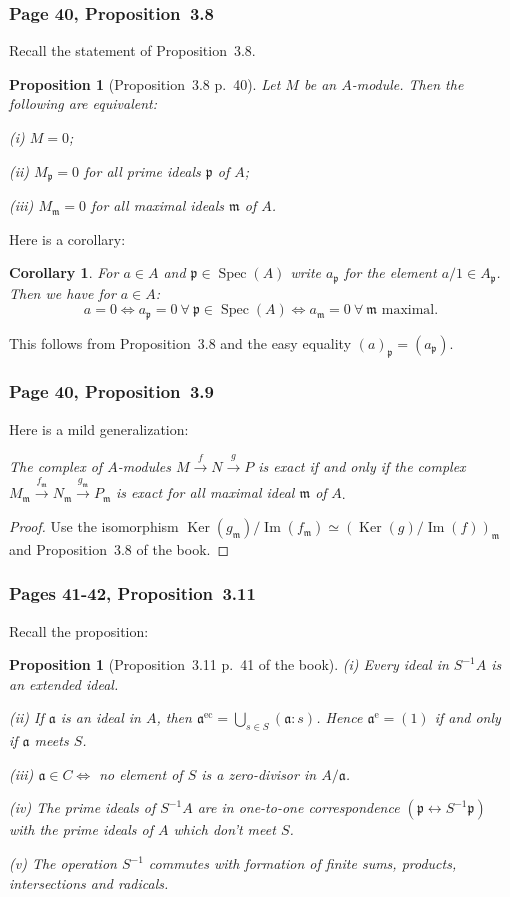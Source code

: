 \documentclass[12pt,letterpaper]{article}%
\newcommand{\oo}{\operatorname}\newcommand{\ooo}{\operatorname*}
\newcommand{\mf}{\mathfrak}
\newcommand{\aaa}{\mf a}
\newcommand{\mmm}{\mf m}
\newcommand{\ppp}{\mf p}
\newcommand{\Spec}{\operatorname{Spec}}\newcommand{\Sp}{\operatorname{Spec}}
\newcommand{\xr}{\xrightarrow}
\newcommand{\nn}{\noindent}
\newtheorem{cor}[thm]{Corollary}
\newtheorem{prop}[thm]{Proposition}
\begin{document}
\subsubsection{Page 40, Proposition~3.8}%

Recall the statement of Proposition~3.8. 

\begin{prop}[Proposition~3.8 p.~40]\label{38}
Let $M$ be an $A$-module. Then the following are equivalent:

\nn\emph{(i)} $M=0$;

\nn\emph{(ii)} $M_\ppp=0$ for all prime ideals $\ppp$ of $A$;

\nn\emph{(iii)} $M_\mmm=0$ for all maximal ideals $\mmm$ of $A$.
\end{prop}

Here is a corollary: 

\begin{cor}\label{ap}
For $a\in A$ and $\ppp\in\Spec(A)$ write $a_\ppp$ for the element $a/1\in A_\ppp$. Then we have for $a\in A$:
$$
a=0\iff a_\ppp=0\ \forall\ \ppp\in\Spec(A)\iff a_\mmm=0\ \forall\ \mmm\text{ maximal.}
$$
\end{cor}

This follows from Proposition~3.8 and the easy equality $(a)_\ppp=(a_\ppp)$. 

\subsubsection{Page 40, Proposition~3.9}\label{re}%

Here is a mild generalization:

\nn\emph{The complex of $A$-modules $M\xr fN\xr g P$ is exact if and only if the complex} $M_\mmm\xr{f_\mmm}N_\mmm\xr{g_\mmm}P_\mmm$ \emph{is exact for all maximal ideal $\mmm$ of} $A$.
\begin{proof}
Use the isomorphism $\oo{Ker}(g_\mmm)/\oo{Im}(f_\mmm)\simeq(\oo{Ker}(g)/\oo{Im}(f))_\mmm$ and Proposition~3.8 of the book.
\end{proof}

\subsubsection{Pages 41-42, Proposition~3.11}%

Recall the proposition:

\begin{prop}[Proposition~3.11 p.~41 of the book]\label{p3.11}
\emph{(i)} Every ideal in $S^{-1}A$ is an extended ideal. 

\nn\emph{(ii)} If $\aaa$ is an ideal in $A$, then $\aaa^{\oo{ec}}=\bigcup_{s\in S}(\aaa:s)$. Hence $\aaa^{\oo e}=(1)$ if and only if $\aaa$ meets $S$.

\nn\emph{(iii)} $\aaa\in C\iff$ no element of $S$ is a zero-divisor in $A/\aaa$.

\nn\emph{(iv)} The prime ideals of $S^{-1}A$ are in one-to-one correspondence $(\ppp\leftrightarrow S^{-1}\ppp)$ with the prime ideals of $A$ which don't meet $S$.

\nn\emph{(v)} The operation $S^{-1}$ commutes with formation of finite sums, products, intersections and radicals.
\end{prop}
\end{document}
